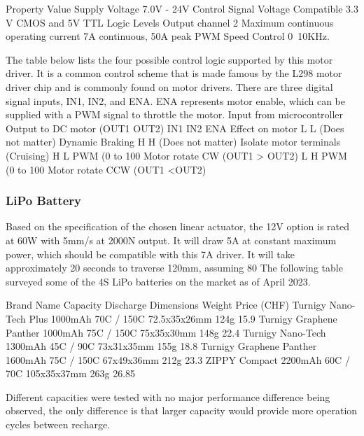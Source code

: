 Property
Value
Supply Voltage
7.0V - 24V
Control Signal Voltage
Compatible 3.3 V CMOS and  5V TTL Logic Levels
Output channel
2
Maximum continuous operating current
7A continuous, 50A peak
PWM Speed Control
0~10KHz.



The table below lists the four possible control logic supported by this motor driver. It is a common control scheme that is made famous by the L298 motor driver chip and is commonly found on motor drivers. There are three digital signal inputs, IN1, IN2, and ENA. ENA represents motor enable, which can be supplied with a PWM signal to throttle the motor.
Input from microcontroller
Output to DC motor (OUT1 OUT2)
IN1
IN2
ENA 
Effect on motor 
L
L
(Does not matter)
Dynamic Braking
H
H
(Does not matter)
Isolate motor terminals (Cruising)
H
L
PWM (0 to 100%
Motor rotate CW (OUT1 > OUT2)
L
H
PWM (0 to 100%
Motor rotate CCW (OUT1 <OUT2)


\subsubsection{LiPo Battery}
\label{subsubsection:exploration-1-lipo-battery}

Based on the specification of the chosen linear actuator, the 12V option is rated at 60W with 5mm/s at 2000N output. It will draw 5A at constant maximum power, which should be compatible with this 7A driver. It will take approximately 20 seconds to traverse 120mm, assuming 80%
The following table surveyed some of the 4S LiPo batteries on the market as of April 2023. 

Brand Name
Capacity
Discharge 
Dimensions
Weight
Price (CHF)
Turnigy Nano-Tech Plus
1000mAh
70C / 150C
72.5x35x26mm
124g
15.9
Turnigy Graphene Panther 
1000mAh
75C / 150C
75x35x30mm
148g
22.4
Turnigy Nano-Tech
1300mAh
45C / 90C
73x31x35mm
155g
18.8
Turnigy Graphene Panther 
1600mAh
75C / 150C
 67x49x36mm
212g
23.3
ZIPPY Compact 
2200mAh
60C / 70C
105x35x37mm
263g
26.85

Different capacities were tested with no major performance difference being observed, the only difference is that larger capacity would provide more operation cycles between recharge.

